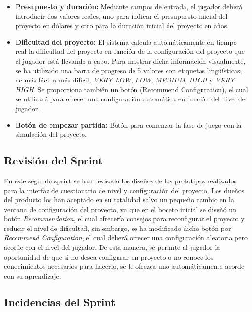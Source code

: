 \begin{itemize}
	\item \textbf{Presupuesto y duración:} Mediante campos de entrada, el jugador deberá introducir dos valores reales, uno para indicar el presupuesto inicial del proyecto en dólares y otro para la duración inicial del proyecto en años.
	\item \textbf{Dificultad del proyecto:} El sistema calcula automáticamente en tiempo real la dificultad del proyecto en función de la configuración del proyecto que el jugador está llevando a cabo. Para mostrar dicha información visualmente, se ha utilizado una barra de progreso de 5 valores con etiquetas lingüísticas, de más fácil a más difícil, \emph{VERY LOW}, \emph{LOW}, \emph{MEDIUM}, \emph{HIGH} y \emph{VERY HIGH}. Se proporciona también un botón (Recommend Configuration), el cual se utilizará para ofrecer una configuración automática en función del nivel de jugador.
	\item \textbf{Botón de empezar partida:} Botón para comenzar la fase de juego con la simulación del proyecto.
\end{itemize}

\subsection{Revisión del Sprint}
\label{sec:RevisionSprin2}

En este segundo sprint se han revisado los diseños de los prototipos realizados para la interfaz de cuestionario de nivel y configuración del proyecto. Los dueños del producto los han aceptado en su totalidad salvo un pequeño cambio en la ventana de configuración del proyecto, ya que en el boceto inicial se diseñó un botón \emph{Recommendation}, el cual ofrecería consejos para reconfigurar el proyecto y reducir el nivel de dificultad, sin embargo, se ha modificado dicho botón por \emph{Recommend Configuration}, el cual deberá ofrecer una configuración aleatoria pero acorde con el nivel del jugador. De esta manera, se permite al jugador la oportunidad de que si no desea configurar un proyecto o no conoce los conocimientos necesarios para hacerlo, se le ofrezca uno automáticamente acorde con su aprendizaje.

\subsection{Incidencias del Sprint}
\label{sec:IncidenciasSprint2}

